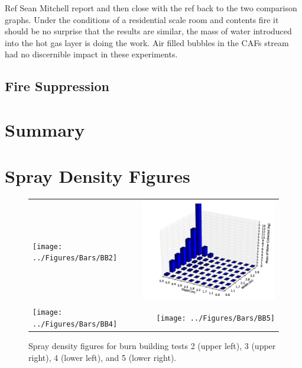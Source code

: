 \documentclass[12pt,oneside]{book}
\begin{document}
Ref Sean Mitchell report and then close with the ref back to the two comparison graphs.   Under the conditions of a residential scale room and contents fire it should be no surprise that the results are similar, the mass of water introduced into the hot gas layer is doing the work.  Air filled bubbles in the CAFs stream had no discernible impact in these experiments.   

\section{Fire Suppression}
\label{sec:Fire_Suppression_discussion}


\chapter{Summary}
\label{chap:Summary}



\appendix

\chapter{Spray Density Figures}
\label{app:spray_density}

\begin{figure}[ht]
\begin{tabular*}{\textwidth}{lr}
\texttt{[image: ../Figures/Bars/BB2]} &
\includegraphics[width=3.2in]{../Figures/Bars/BB3} \\
\texttt{[image: ../Figures/Bars/BB4]} &
\texttt{[image: ../Figures/Bars/BB5]}
\end{tabular*}
\caption{Spray density figures for burn building tests 2 (upper left), 3 (upper right), 4 (lower left), and 5 (lower right).}
\label{fig:bb_2_5}
\end{figure}

\clearpage
\end{document}

